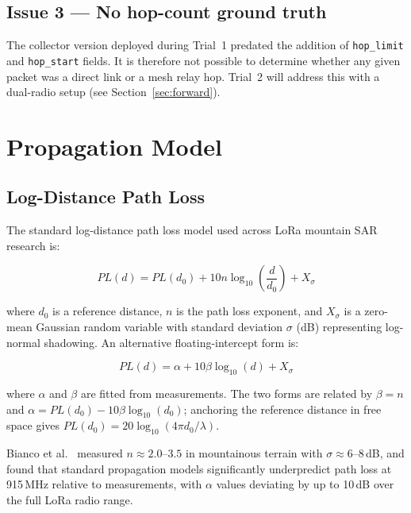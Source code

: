 \documentclass[11pt,letterpaper]{article}
\begin{document}
\subsection*{Issue 3 --- No hop-count ground truth}
The collector version deployed during Trial~1 predated the addition of
\texttt{hop\_limit} and \texttt{hop\_start} fields. It is therefore not possible to
determine whether any given packet was a direct link or a mesh relay hop. Trial~2 will
address this with a dual-radio setup (see Section~\ref{sec:forward}).

\section{Propagation Model}

\subsection{Log-Distance Path Loss}

The standard log-distance path loss model used across LoRa mountain SAR research
\cite{bianco2021, review2024} is:

\begin{equation}
  PL(d) = PL(d_0) + 10n \log_{10}\!\left(\frac{d}{d_0}\right) + X_\sigma
  \label{eq:logdist}
\end{equation}

where $d_0$ is a reference distance, $n$ is the path loss exponent, and $X_\sigma$ is a
zero-mean Gaussian random variable with standard deviation $\sigma$ (dB) representing
log-normal shadowing. An alternative floating-intercept form \cite{review2024} is:

\begin{equation}
  PL(d) = \alpha + 10\beta \log_{10}(d) + X_\sigma
  \label{eq:floating}
\end{equation}

where $\alpha$ and $\beta$ are fitted from measurements. The two forms are related by
$\beta = n$ and $\alpha = PL(d_0) - 10\beta\log_{10}(d_0)$; anchoring the reference
distance in free space gives $PL(d_0) = 20\log_{10}(4\pi d_0/\lambda)$.

\medskip

Bianco et al.\ \cite{bianco2021} measured $n \approx 2.0$--$3.5$ in mountainous terrain
with $\sigma \approx 6$--$8$\,dB, and found that standard propagation models
significantly underpredict path loss at 915\,MHz relative to measurements, with $\alpha$
values deviating by up to 10\,dB over the full LoRa radio range.
\end{document}
